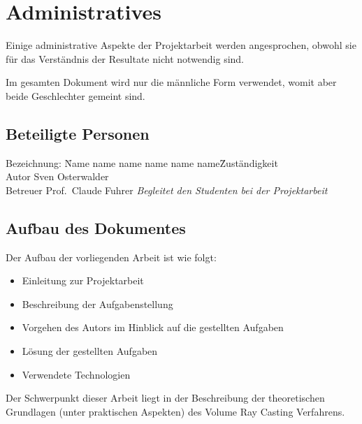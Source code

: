 
\chapter{Administratives}
\label{chap:20_administrative}

Einige administrative Aspekte der Projektarbeit werden angesprochen, obwohl sie für das Verständnis der Resultate nicht notwendig sind.

Im gesamten Dokument wird nur die männliche Form verwendet, womit aber beide Geschlechter gemeint sind.

\section{Beteiligte Personen}
\label{sec:involved_persons}

\begin{tabbing} %
Bezeichnung: \= Name name name name name name\= Zuständigkeit \kill \\
    Autor           \> Sven Osterwalder\protect\footnotemark[1]{}    \> \\
    Betreuer        \> Prof.\ Claude Fuhrer\protect\footnotemark[2]{}  \> \textit{Begleitet den Studenten bei der Projektarbeit}\\
\end{tabbing}

\section{Aufbau des Dokumentes}
\label{sec:document_structure}

Der Aufbau der vorliegenden Arbeit ist wie folgt:
\begin{itemize}
    \item Einleitung zur Projektarbeit
    \item Beschreibung der Aufgabenstellung
    \item Vorgehen des Autors im Hinblick auf die gestellten Aufgaben
    \item Lösung der gestellten Aufgaben
    \item Verwendete Technologien
\end{itemize}

Der Schwerpunkt dieser Arbeit liegt in der Beschreibung der theoretischen Grundlagen (unter praktischen Aspekten) des Volume Ray Casting Verfahrens.

